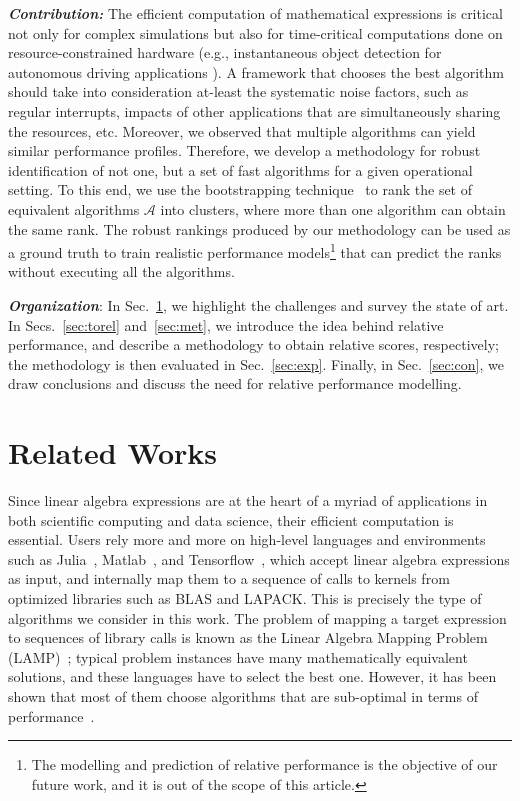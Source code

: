 \documentclass[conference]{IEEEtran}
\begin{document}
\textbf{\textit{Contribution:} }The efficient computation of mathematical expressions is critical not only for complex
simulations but also for time-critical computations done on resource-constrained hardware \cite{towardsEdgeComputing}
(e.g., instantaneous object detection for autonomous driving applications \cite{connectedvehicles}). A framework that
chooses the best algorithm should take into consideration at-least the systematic noise factors, such as  regular
interrupts, impacts of  other applications that are simultaneously sharing the resources, etc. Moreover, we observed that
multiple algorithms can yield similar performance profiles. Therefore,  we develop a methodology for robust identification of not one, but a set of  fast algorithms for a given operational setting. To this end, we use the bootstrapping technique~\cite{bootstrap} to rank the set of equivalent algorithms $\mathcal{A}$ into clusters, where more than one algorithm can obtain the same rank. The robust rankings produced by our methodology can be used as a ground truth to train realistic performance models\footnote{The modelling and prediction of relative performance is the objective of our future work, and it is out of the scope of this article.} that can predict the ranks without executing all the algorithms.

\textit{\textbf{Organization}}: In Sec.~\ref{sec:rel}, we highlight the challenges and survey the state of art. In
Secs.~\ref{sec:torel} and~\ref{sec:met}, we introduce the idea behind relative performance, and describe a methodology
to obtain relative scores, respectively; the methodology is then evaluated in Sec.~\ref{sec:exp}.
 Finally, in Sec.~\ref{sec:con}, we
draw conclusions and discuss the need for relative performance modelling. 
  

\section{Related Works}
\label{sec:rel}

Since linear algebra expressions are at the heart of a myriad of
applications in both scientific computing and data science,
their efficient computation is essential. Users rely more and more on high-level languages and
environments such as Julia~\cite{julia}, Matlab~\cite{MatlabOTB}, and Tensorflow~\cite{tensorflow}, which accept linear
algebra expressions as input, and internally map them to a sequence of calls to kernels from optimized libraries such as
BLAS and LAPACK. This is precisely the type of algorithms we consider in this work. The problem of mapping a target
expression to sequences of library calls is known as the Linear Algebra Mapping Problem (LAMP)~\cite{psarras2019linear};
typical problem instances have many mathematically equivalent solutions, and these languages have to select the best
one. However, it has been shown that most of them choose algorithms that are sub-optimal in terms of performance~\cite{psarras2019linear,barthels2019linnea}.
\end{document}
